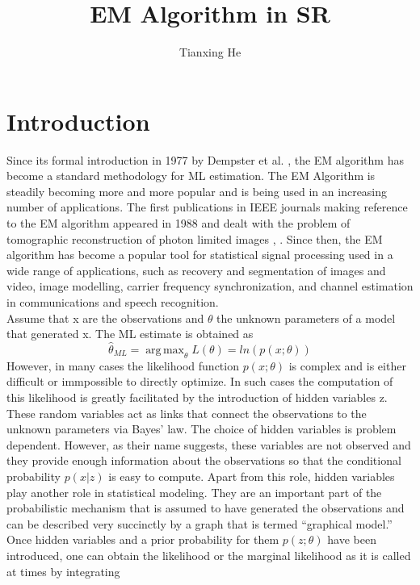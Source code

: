 \documentclass[11pt]{article}
\title{\textbf{EM Algorithm in SR}}
\author{Tianxing He}
\date{}
\DeclareMathOperator*{\argmax}{arg\,max}
\begin{document}

\maketitle

\section{Introduction}
Since its formal introduction in 1977 by Dempster et al. \cite{ADempsterEM}, the EM algorithm has become a standard methodology for ML estimation. The EM Algorithm is steadily becoming more and more popular and is being used in an increasing number of applications. The first publications in IEEE journals making reference to the EM algorithm appeared in 1988 and dealt with the problem of tomographic reconstruction of photon limited images \cite{1977Posit}, \cite{1988Bayes}. Since then, the EM algorithm has become a popular tool for statistical signal processing used in a wide range of applications, such as recovery and segmentation of images and video, image modelling, carrier frequency synchronization, and channel estimation in communications and speech recognition. \\
Assume that x are the observations and $\theta$ the unknown parameters of a model that generated x. The ML estimate is obtained as 
\begin{equation}
\hat{\theta}_{ML}= \argmax_{\theta}L(\theta) = ln(p(x;\theta))
\end{equation}
However, in many cases the likelihood function $p(x;\theta)$ is complex and is either difficult or immpossible to directly optimize. In such cases the computation of this likelihood is greatly facilitated by the introduction of hidden variables z. These random variables act as links that connect the observations to the unknown parameters via Bayes’ law. The choice of hidden variables is problem dependent. However, as their name suggests, these variables are not observed and they provide enough information about the observations so that the conditional probability $p(x|z)$ is easy to compute. Apart from this role, hidden variables play
another role in statistical modeling. They are an important part of the probabilistic mechanism that is assumed to have generated the observations and can be described very succinctly by a graph that is termed “graphical model.” 
Once hidden variables and a prior probability for them $p(z;\theta)$ have been introduced, one can obtain the likelihood or the marginal likelihood as it is called at times by integrating
\end{document}
